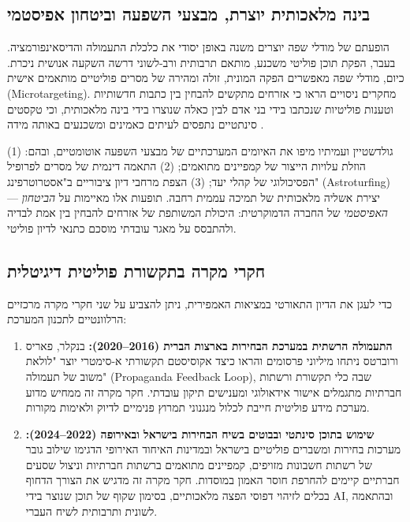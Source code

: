\subsection{בינה מלאכותית יוצרת, מבצעי השפעה וביטחון אפיסטמי}
הופעתם של מודלי שפה יוצרים משנה באופן יסודי את כלכלת התעמולה והדיסאינפורמציה. בעבר, הפקת תוכן פוליטי משכנע, מותאם תרבותית ורב-לשוני דרשה השקעה אנושית ניכרת. כיום, מודלי שפה מאפשרים הפקה המונית, זולה ומהירה של מסרים פוליטיים מותאמים אישית (Microtargeting). מחקרים ניסויים הראו כי אזרחים מתקשים להבחין בין כתבות חדשותיות וטענות פוליטיות שנכתבו בידי בני אדם לבין כאלה שנוצרו בידי בינה מלאכותית, וכי טקסטים סינתטיים נתפסים לעיתים כאמינים ומשכנעים באותה מידה \cite{kreps2022all}.

גולדשטיין ועמיתיו \cite{goldstein2023generative} מיפו את האיומים המערכתיים של מבצעי השפעה אוטומטיים, ובהם: (1) הוזלת עלויות הייצור של קמפיינים מתואמים; (2) התאמה דינמית של מסרים לפרופיל הפסיכולוגי של קהלי יעד; (3) הצפת מרחבי דיון ציבוריים ב"אסטרוטרפינג" (Astroturfing) --- יצירת אשליה מלאכותית של תמיכה עממית רחבה. תופעות אלו מאיימות על \emph{הביטחון האפיסטמי} של החברה הדמוקרטית: היכולת המשותפת של אזרחים להבחין בין אמת לבדיה ולהתבסס על מאגר עובדתי מוסכם כתנאי לדיון פוליטי.

\subsection{חקרי מקרה בתקשורת פוליטית דיגיטלית}
כדי לעגן את הדיון התאורטי במציאות האמפירית, ניתן להצביע על שני חקרי מקרה מרכזיים הרלוונטיים לתכנון המערכת:
\begin{enumerate}
    \item \textbf{התעמולה הרשתית במערכת הבחירות בארצות הברית (2016--2020):} בנקלר, פאריס ורוברטס \cite{benkler2018network} ניתחו מיליוני פרסומים והראו כיצד אקוסיסטם תקשורתי א-סימטרי יוצר "לולאת משוב של תעמולה" (Propaganda Feedback Loop), שבה כלי תקשורת ורשתות חברתיות מתגמלים אישור אידאולוגי ומענישים תיקון עובדתי. חקר מקרה זה ממחיש מדוע מערכת מידע פוליטית חייבת לכלול מנגנוני תמרוץ פנימיים לדיוק ולאימות מקורות.
    \item \textbf{שימוש בתוכן סינתטי ובבוטים בשיח הבחירות בישראל ובאירופה (2022--2024):} מערכות בחירות ומשברים פוליטיים בישראל ובמדינות האיחוד האירופי הדגימו שילוב גובר של רשתות חשבונות מזויפים, קמפיינים מתואמים ברשתות חברתיות וניצול שסעים חברתיים קיימים להחרפת חוסר האמון במוסדות. חקר מקרה זה מדגיש את הצורך הדחוף בכלים לזיהוי דפוסי הפצה מלאכותיים, בסימון שקוף של תוכן שנוצר בידי AI, ובהתאמה לשונית ותרבותית לשיח העברי.
\end{enumerate}

